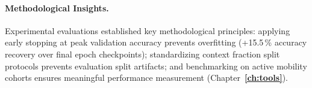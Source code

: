 \paragraph{Methodological Insights.} Experimental evaluations established key methodological principles: applying early stopping at peak validation accuracy prevents overfitting (+15.5\,\% accuracy recovery over final epoch checkpoints); standardizing context fraction split protocols prevents evaluation split artifacts; and benchmarking on active mobility cohorts ensures meaningful performance measurement (Chapter~\textbf{\ref{ch:tools}}).


